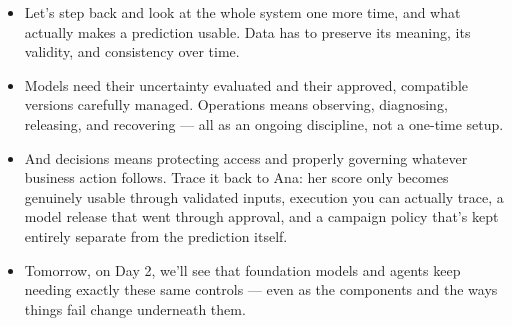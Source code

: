 \documentclass[11pt,a4paper]{article}
\begin{document}
\begin{examplebox}[title after break={SPOKEN SCRIPT --- slide 53 continued}]
\begin{itemize}
\item Let's step back and look at the whole system one more time, and what actually makes a prediction usable. Data has to preserve its meaning, its validity, and consistency over time.
\item Models need their uncertainty evaluated and their approved, compatible versions carefully managed. Operations means observing, diagnosing, releasing, and recovering — all as an ongoing discipline, not a one-time setup.
\item And decisions means protecting access and properly governing whatever business action follows. Trace it back to Ana: her score only becomes genuinely usable through validated inputs, execution you can actually trace, a model release that went through approval, and a campaign policy that's kept entirely separate from the prediction itself.
\item Tomorrow, on Day 2, we'll see that foundation models and agents keep needing exactly these same controls — even as the components and the ways things fail change underneath them.
\end{itemize}
\end{examplebox}
\par\noindent{\scriptsize\textcolor{teal!60!black}{Reading anchor: Bass, Ch. 14 · Group synthesis}}
\clearpage
\end{document}
